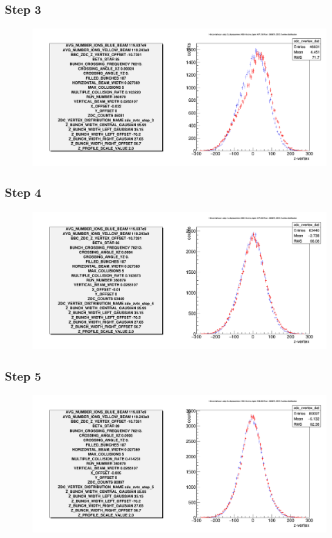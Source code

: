 \begin{frame}
  \frametitle{Step 3}
  \begin{figure}
    \includegraphics[width=\linewidth]{"./figures/tuned_simulation_step_3"}
    \label{fig:step_3}
  \end{figure}
\end{frame}

\begin{frame}
  \frametitle{Step 4}
  \begin{figure}
    \includegraphics[width=\linewidth]{"./figures/tuned_simulation_step_4"}
    \label{fig:step_4}
  \end{figure}
\end{frame}

\begin{frame}
  \frametitle{Step 5}
  \begin{figure}
    \includegraphics[width=\linewidth]{"./figures/tuned_simulation_step_5"}
    \label{fig:step_5}
  \end{figure}
\end{frame}

